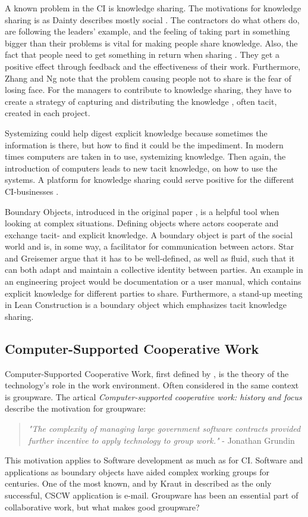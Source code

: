 A known problem in the CI is knowledge sharing. The motivations for knowledge sharing is as Dainty describes mostly social \cite{dainty2005hrm}. The contractors do what others do, are following the leaders' example, and the feeling of taking part in something bigger than their problems is vital for making people share knowledge. Also, the fact that people need to get something in return when sharing \cite{zhangAttitude}. They get a positive effect through feedback and the effectiveness of their work. Furthermore, Zhang and Ng note that the problem causing people not to share is the fear of losing face. For the managers to contribute to knowledge sharing, they have to create a strategy of capturing and distributing the knowledge \cite{kamara2002knowledge}, often tacit, created in each project.  

Systemizing could help digest explicit knowledge because sometimes the information is there, but how to find it could be the impediment. In modern times computers are taken in to use, systemizing knowledge. Then again, the introduction of computers leads to new tacit knowledge, on how to use the systems. A platform for knowledge sharing could serve positive for the different CI-businesses \cite{kivrak2008capturing}. 

Boundary Objects, introduced in the original paper \cite{star&griesemer}, is a helpful tool when looking at complex situations. Defining objects where actors cooperate and exchange tacit- and explicit knowledge. A boundary object is part of the social world and is, in some way, a facilitator for communication between actors. Star and Greisemer argue that it has to be well-defined, as well as fluid, such that it can both adapt and maintain a collective identity between parties. An example in an engineering project would be documentation or a user manual, which contains explicit knowledge for different parties to share. Furthermore, a stand-up meeting in Lean Construction is a boundary object which emphasizes tacit knowledge sharing.

\subsection{Computer-Supported Cooperative Work}
Computer-Supported Cooperative Work, first defined by \cite{Friedman}, is the theory of the technology's role in the work environment. Often considered in the same context is groupware. The artical \textit{Computer-supported cooperative work: history and focus} \cite{Grudin} describe the motivation for groupware: 
\begin{quotation}
    \noindent \textit{"The complexity of managing large government software contracts provided further incentive to apply technology to group work."} - Jonathan Grundin
\end{quotation}
This motivation applies to Software development as much as for CI. Software and applications as boundary objects have aided complex working groups for centuries. One of the most known, and by Kraut in \cite{Kraut} described as the only successful, CSCW application is e-mail. Groupware has been an essential part of collaborative work, but what makes good groupware? 


